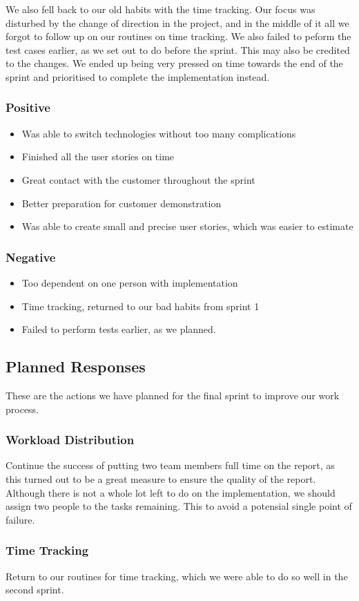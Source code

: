\newline
\newline
We also fell back to our old habits with the time tracking. Our focus was disturbed by the change of direction in the project, and in the middle of it all we forgot to follow up on our routines on time tracking. We also failed to peform the test cases earlier, as we set out to do before the sprint. This may also be credited to the changes. We ended up being very pressed on time towards the end of the sprint and prioritised to complete the implementation instead.

\subsubsection{Positive}

\begin{itemize}
\item Was able to switch technologies without too many complications
\item Finished all the user stories on time
\item Great contact with the customer throughout the sprint
\item Better preparation for customer demonstration
\item Was able to create small and precise user stories, which was easier to estimate
\end{itemize}

\subsubsection{Negative}

\begin{itemize}
\item Too dependent on one person with implementation
\item Time tracking, returned to our bad habits from sprint 1
\item Failed to perform tests earlier, as we planned.
\end{itemize}

\subsection{Planned Responses}
These are the actions we have planned for the final sprint to improve our work process.

\subsubsection{Workload Distribution}
Continue the success of putting two team members full time on the report, as this turned out to be a great measure to ensure the quality of the report. Although there is not a whole lot left to do on the implementation, we should assign two people to the tasks remaining. This to avoid a potensial single point of failure.

\subsubsection{Time Tracking}
Return to our routines for time tracking, which we were able to do so well in the second sprint.



